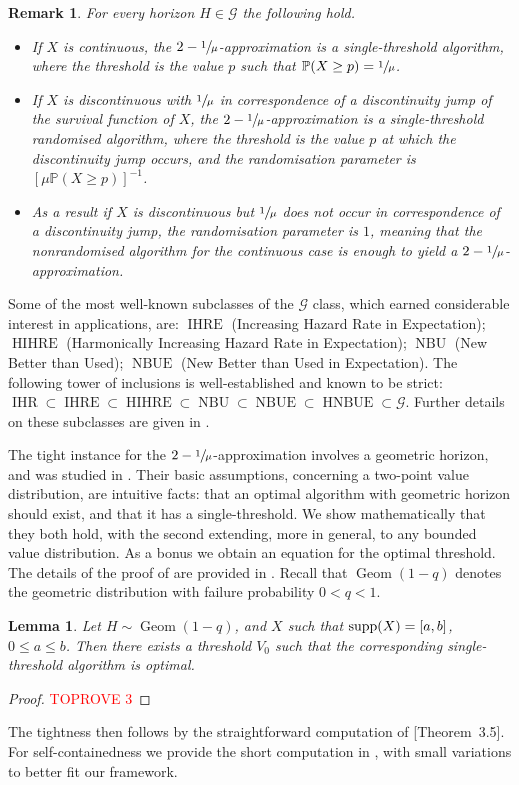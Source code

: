 \documentclass[11pt, a4paper, twoside]{article}
\newcommand{\PP}{\mathbb{P}}
\newcommand{\PGF}{\mathcal{G}}
\DeclareMathOperator{\Geom}{Geom}
\DeclareMathOperator{\IHR}{IHR}
\DeclareMathOperator{\IHRE}{IHRE}
\DeclareMathOperator{\HIHRE}{HIHRE}
\DeclareMathOperator{\NBU}{NBU}
\DeclareMathOperator{\NBUE}{NBUE}
\DeclareMathOperator{\HNBUE}{HNBUE}
\newtheorem{lemma}{Lemma}[section]
\newtheorem{remark}{Remark}[section]
\numberwithin{equation}{section}
\begin{document}
	\begin{remark}\label{algorithm}
		For every horizon $H\in\PGF$ the following hold.
		\begin{itemize}[noitemsep]
			\item If $X$ is continuous, the $2-\sfrac{1}{\mu}$-approximation is a single-threshold algorithm, where the threshold is the value $p$ such that $\PP(X\ge p)=\sfrac{1}{\mu}$.
			\item If $X$ is discontinuous with $\sfrac{1}{\mu}$ in correspondence of a discontinuity jump of the survival function of $X$, the $2-\sfrac{1}{\mu}$-approximation is a single-threshold randomised algorithm, where the threshold is the value $p$ at which the discontinuity jump occurs, and the randomisation parameter is $[\mu\PP(X\ge p)]^{-1}$. 
			\item As a result if $X$ is discontinuous but $\sfrac{1}{\mu}$ does not occur in correspondence of a discontinuity jump, the randomisation parameter is $1$, meaning that the nonrandomised algorithm for the continuous case is enough to yield a $2-\sfrac{1}{\mu}$-approximation.
		\end{itemize}
	\end{remark}
	Some of the most well-known subclasses of the $\PGF$ class, which earned considerable interest in applications, are: $\IHRE$ (Increasing Hazard Rate in Expectation); $\HIHRE$ (Harmonically Increasing Hazard Rate in Expectation); $\NBU$ (New Better than Used); $\NBUE$ (New Better than Used in Expectation). The following tower of inclusions is well-established \cite{BraqRoyXie01,Rol75,Klef82} and known to be strict: $\IHR\subset\IHRE\subset\HIHRE\subset\NBU\subset\NBUE\subset\HNBUE\subset\PGF$. Further details on these subclasses are given in .
		
  	The tight instance for the $2-\sfrac{1}{\mu}$-approximation involves a geometric horizon, and was studied in \cite[Theorem~3.5]{AliBanGolMunWan20}. Their basic assumptions, concerning a two-point value distribution, are intuitive facts: that an optimal algorithm with geometric horizon should exist, and that it has a single-threshold. We show mathematically that they both hold, with the second extending, more in general, to any bounded value distribution. As a bonus we obtain an equation for the optimal threshold. The details of the proof of  are provided in . Recall that $\Geom(1-q)$ denotes the geometric distribution with failure probability $0<q<1$.
	\begin{lemma}\label{geomprice}
		Let $H\sim\Geom(1-q)$, and $X$ such that $\operatorname{supp}(X)=[a,b]$, $0\le a\le b$. Then there exists a threshold $V_0$ such that the corresponding single-threshold algorithm is optimal.
	\end{lemma}
	\begin{proof}\textcolor{red}{TOPROVE 3}\end{proof}
	The tightness then follows by the straightforward computation of \cite{AliBanGolMunWan20}[Theorem~3.5]. For self-containedness we provide the short computation in , with small variations to better fit our framework.
	
\end{document}
